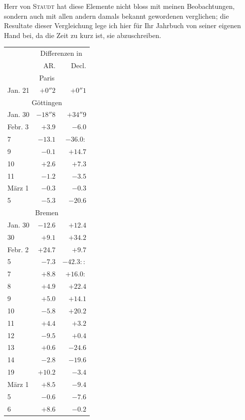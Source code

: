 Herr von \textsc{Staudt} hat diese Elemente nicht bloss mit meinen Beobachtungen, sondern auch mit allen andern damals bekannt gewordenen verglichen; die Resultate dieser Vergleichung lege ich hier für Ihr Jahrbuch von seiner eigenen Hand bei, da die Zeit zu kurz ist, sie abzuschreiben.

\begin{center}
\begin{tabular}{l|r|r}
& \multicolumn{2}{c}{Differenzen in} \\
& AR. & Decl. \\
\multicolumn{3}{c}{Paris} \\
Jan. 21 & $+0''2$ & $+0''1$ \\
\multicolumn{3}{c}{Göttingen} \\
Jan. 30 & $-18''8$ & $+34''9$ \\
Febr. 3 & $+3.9$ & $-6.0$ \\
7 & $-13.1$ & $-36.0\!:$ \\
9 & $-0.1$ & $+14.7$ \\
10 & $+2.6$ & $+7.3$ \\
11 & $-1.2$ & $-3.5$ \\
März 1 & $-0.3$ & $-0.3$ \\
5 & $-5.3$ & $-20.6$ \\
\multicolumn{3}{c}{Bremen} \\
Jan. 30 & $-12.6$ & $+12.4$ \\
30 & $+9.1$ & $+34.2$ \\
Febr. 2 & $+24.7$ & $+9.7$ \\
5 & $-7.3$ & $-42.3\!::$ \\
7 & $+8.8$ & $+16.0\!:$ \\
8 & $+4.9$ & $+22.4$ \\
9 & $+5.0$ & $+14.1$ \\
10 & $-5.8$ & $+20.2$ \\
11 & $+4.4$ & $+3.2$ \\
12 & $-9.5$ & $+0.4$ \\
13 & $+0.6$ & $-24.6$ \\
14 & $-2.8$ & $-19.6$ \\
19 & $+10.2$ & $-3.4$ \\
März 1 & $+8.5$ & $-9.4$ \\
5 & $-0.6$ & $-7.6$ \\
6 & $+8.6$ & $-0.2$ \\
\end{tabular}
\end{center}

